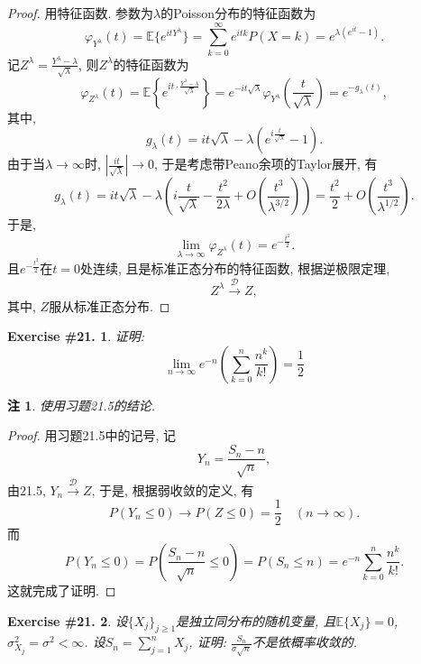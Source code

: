 \documentclass[UTF8, a4paper]{article}
\newtheorem{exercise}{Exercise \#21.}
\newtheorem*{remark}{注}
\begin{document}
\begin{proof}
用特征函数. 参数为\(\lambda\)的Poisson分布的特征函数为
$$
\varphi_{Y^\lambda}(t) = \mathbb{E}\{e^{itY^\lambda}\} = \sum_{k = 0}^{\infty}e^{itk}P(X = k) = e^{\lambda(e^{it} - 1)}.
$$
记\(Z^\lambda =  \frac{Y^\lambda-\lambda}{\sqrt{\lambda}}\),
则\(Z^\lambda\)的特征函数为 
$$
\varphi_{Z^\lambda}(t) = \mathbb{E}\left\{e^{it\cdot \frac{Y^\lambda-\lambda}{\sqrt{\lambda}}}\right\} = e^{-it\sqrt{\lambda}} \varphi_{Y^\lambda}\left(\frac{t}{\sqrt{\lambda}}\right) = e^{-g_\lambda(t)},
$$
其中, 
$$
g_\lambda(t) = it\sqrt{\lambda} - \lambda( e^{i\frac{t}{\sqrt{\lambda}}} - 1).
$$
由于当\(\lambda \to \infty\)时, \(\left|\frac{it}{\sqrt{\lambda}}\right| \to 0\), 于是考虑带Peano余项的Taylor展开, 有
$$
g_\lambda(t) = it\sqrt{\lambda} - \lambda \left(i \frac{t}{\sqrt{\lambda}} - \frac{t^2}{2\lambda} + O\left(\frac{t^3}{\lambda^{3/2}}\right)\right) = \frac{t^2}{2} + O\left(\frac{t^3}{\lambda^{1/2}}\right).
$$
于是, 
$$
\lim_{\lambda\to\infty} \varphi_{Z^\lambda}(t) = e^{-\frac{t^2}{2}}.
$$
且\(e^{-\frac{t^2}{2}}\)在\(t = 0\)处连续, 且是标准正态分布的特征函数, 根据逆极限定理, 
$$
Z^\lambda \xrightarrow{\mathcal{D}} Z,
$$
其中, \(Z\)服从标准正态分布.
\end{proof}


\begin{framed}
\begin{exercise}
证明: 
$$
\lim _{n \rightarrow \infty} e^{-n}\left(\sum_{k=0}^n \frac{n^k}{k!}\right)=\frac{1}{2}
$$
\end{exercise}
\end{framed}
\begin{remark}
    使用习题21.5的结论.
\end{remark}

\begin{proof}
用习题21.5中的记号, 记 
$$
Y_n = \frac{S_n - n}{\sqrt{n}}, 
$$
由21.5, \(Y_n \xrightarrow{\mathcal{D}} Z\), 于是, 根据弱收敛的定义, 有
$$
P(Y_n \leq 0) \to P(Z \leq 0) = \frac{1}{2} \quad ( n\to \infty).
$$
而 
$$
P(Y_n \leq 0) = P\left(\frac{S_n - n}{\sqrt{n}} \leq 0\right) = P\left(S_n \leq n\right) = e^{-n}\sum_{k=0}^n \frac{n^k}{k!}.
$$
这就完成了证明.
\end{proof}


\begin{framed}
\begin{exercise}
设\(\{X_j\}_{j\geq 1}\)是独立同分布的随机变量, 且\(\mathbb{E}\{X_j\} = 0\), \(\sigma_{X_j}^2 = \sigma^2 < \infty\).
设\(S_n = \sum_{j=1}^{n}X_j\), 证明:
\(\frac{S_n}{\sigma \sqrt{n}}\)不是依概率收敛的.
\end{exercise}
\end{framed}
\end{document}

